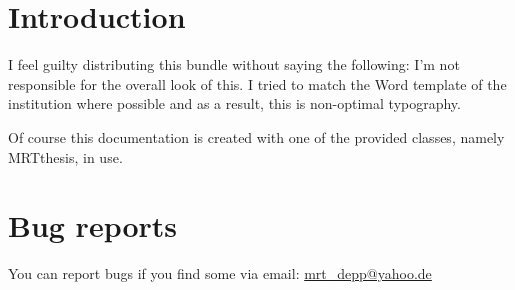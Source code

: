 \documentclass[oneside]{MRTthesis}
\newcommand*\cls[1]{\textrm{#1}}
\begin{document}
\tableofcontents
\mainpart
\chapter{Introduction}
I feel guilty distributing this bundle without saying the following: I'm not
responsible for the overall look of this. I tried to match the Word template of
the institution where possible and as a result, this is non-optimal typography.

Of course this documentation is created with one of the provided classes, namely
\cls{MRTthesis}, in use.






\chapter{Bug reports}
You can report bugs if you find some via email:
\href{mailto:mrt_depp@yahoo.de?subject=MRTbundle -- bug report}
  {mrt\_depp@yahoo.de}
\end{document}
